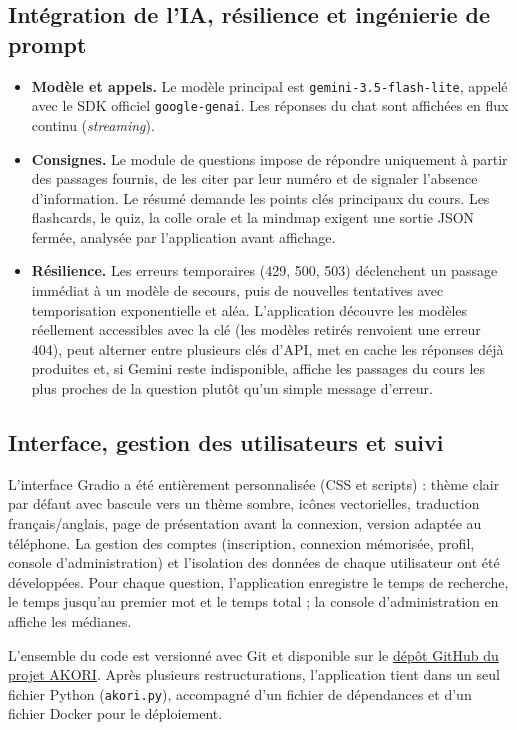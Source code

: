 \documentclass[12pt,a4paper,oneside]{report}
\begin{document}
\subsection*{Intégration de l'IA, résilience et ingénierie de prompt}

\begin{itemize}
  \item \textbf{Modèle et appels.} Le modèle principal est \texttt{gemini-3.5-flash-lite}, appelé avec le SDK officiel \texttt{google-genai}. Les réponses du chat sont affichées en flux continu (\emph{streaming}).
  \item \textbf{Consignes.} Le module de questions impose de répondre uniquement à partir des passages fournis, de les citer par leur numéro et de signaler l'absence d'information. Le résumé demande les points clés principaux du cours. Les flashcards, le quiz, la colle orale et la mindmap exigent une sortie JSON fermée, analysée par l'application avant affichage.
  \item \textbf{Résilience.} Les erreurs temporaires (429, 500, 503) déclenchent un passage immédiat à un modèle de secours, puis de nouvelles tentatives avec temporisation exponentielle et aléa. L'application découvre les modèles réellement accessibles avec la clé (les modèles retirés renvoient une erreur 404), peut alterner entre plusieurs clés d'API, met en cache les réponses déjà produites et, si Gemini reste indisponible, affiche les passages du cours les plus proches de la question plutôt qu'un simple message d'erreur.
\end{itemize}

\subsection*{Interface, gestion des utilisateurs et suivi}

L'interface Gradio a été entièrement personnalisée (CSS et scripts) : thème clair par défaut avec bascule vers un thème sombre, icônes vectorielles, traduction français/anglais, page de présentation avant la connexion, version adaptée au téléphone. La gestion des comptes (inscription, connexion mémorisée, profil, console d'administration) et l'isolation des données de chaque utilisateur ont été développées. Pour chaque question, l'application enregistre le temps de recherche, le temps jusqu'au premier mot et le temps total ; la console d'administration en affiche les médianes.

L'ensemble du code est versionné avec Git et disponible sur le \href{https://github.com/rafalimanananomeniavoedmjohana-bit/AKORI.git}{dépôt GitHub du projet AKORI}. Après plusieurs restructurations, l'application tient dans un seul fichier Python (\texttt{akori.py}), accompagné d'un fichier de dépendances et d'un fichier Docker pour le déploiement.
\end{document}

